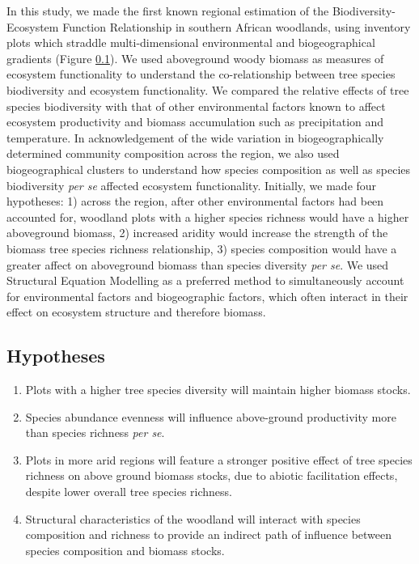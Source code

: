 \documentclass[11pt,a4paper]{article}
\begin{document}
In this study, we made the first known regional estimation of the Biodiversity-Ecosystem Function Relationship in southern African woodlands, using inventory plots which straddle multi-dimensional environmental and biogeographical gradients (Figure \ref{}). We used aboveground woody biomass  as measures of ecosystem functionality to understand the co-relationship between tree species biodiversity and ecosystem functionality. We compared the relative effects of tree species biodiversity with that of other environmental factors known to affect ecosystem productivity and biomass accumulation such as precipitation and temperature. In acknowledgement of the wide variation in biogeographically determined community composition across the region, we also used biogeographical clusters \citep{} to understand how species composition as well as species biodiversity \textit{per se} affected ecosystem functionality. Initially, we made four hypotheses: 1) across the region, after other environmental factors had been accounted for, woodland plots with a higher species richness would have a higher aboveground biomass, 2) increased aridity would increase the strength of the biomass tree species richness relationship, 3) species composition would have a greater affect on aboveground biomass than species diversity \textit{per se}. We used Structural Equation Modelling as a preferred method to simultaneously account for environmental factors and biogeographic factors, which often interact in their effect on ecosystem structure and therefore biomass. 


\subsection{Hypotheses}

\begin{enumerate}
	\item{Plots with a higher tree species diversity will maintain higher biomass stocks.}
	\item{Species abundance evenness will influence above-ground productivity more than species richness \textit{per se}.}
	\item{Plots in more arid regions will feature a stronger positive effect of tree species richness on above ground biomass stocks, due to abiotic facilitation effects, despite lower overall tree species richness.}
	\item{Structural characteristics of the woodland will interact with species composition and richness to provide an indirect path of influence between species composition and biomass stocks.}
\end{enumerate}
\end{document}
